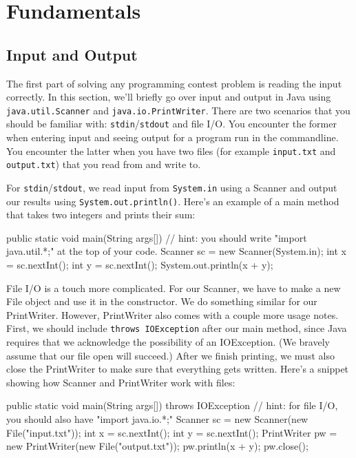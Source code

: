 \chapter{Fundamentals}

\section{Input and Output}

The first part of solving any programming contest problem is reading the input correctly. In this section, we'll briefly go over input and output in Java using \texttt{java.util.Scanner} and \texttt{java.io.PrintWriter}. There are two scenarios that you should be familiar with: \texttt{stdin}/\texttt{stdout} and file I/O. You encounter the former when entering input and seeing output for a program run in the commandline. You encounter the latter when you have two files (for example \texttt{input.txt} and \texttt{output.txt}) that you read from and write to.

For \texttt{stdin}/\texttt{stdout}, we read input from \texttt{System.in} using a Scanner and output our results using \texttt{System.out.println()}. Here's an example of a main method that takes two integers and prints their sum:

\begin{mylstlisting}
public static void main(String args[]){
  // hint: you should write "import java.util.*;" at the top of your code.
  Scanner sc = new Scanner(System.in);
  int x = sc.nextInt();
  int y = sc.nextInt();
  System.out.println(x + y);
}
\end{mylstlisting}

File I/O is a touch more complicated. For our Scanner, we have to make a new File object and use it in the constructor. We do something similar for our PrintWriter. However, PrintWriter also comes with a couple more usage notes. First, we should include \texttt{throws IOException} after our main method, since Java requires that we acknowledge the possibility of an IOException. (We bravely assume that our file open will succeed.) After we finish printing, we must also close the PrintWriter to make sure that everything gets written. Here's a snippet showing how Scanner and PrintWriter work with files: 

\begin{mylstlisting}
public static void main(String args[]) throws IOException {
  // hint: for file I/O, you should also have "import java.io.*;"
  Scanner sc = new Scanner(new File("input.txt"));
  int x = sc.nextInt();
  int y = sc.nextInt();
  PrintWriter pw = new PrintWriter(new File("output.txt"));
  pw.println(x + y);
  pw.close();
}
\end{mylstlisting}

